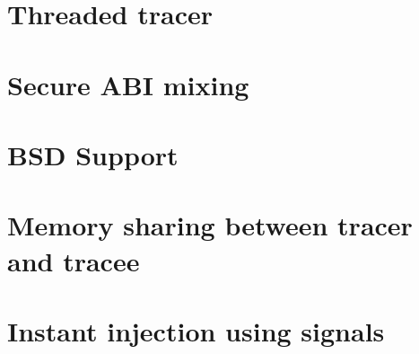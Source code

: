 \documentclass[a4paper, twoside, 10pt]{report}
\begin{document}
\section{Threaded tracer}


\section{Secure ABI mixing}


\section{BSD Support}


\section{Memory sharing between tracer and tracee}


\section{Instant injection using signals}


\end{document}

